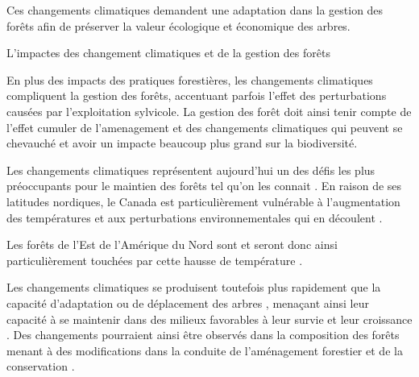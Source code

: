 Ces changements climatiques demandent une adaptation dans la gestion des forêts afin de préserver la valeur écologique et économique des arbres. 




L'impactes des changement climatiques et de la gestion des forêts 

En plus des impacts des pratiques forestières, les changements climatiques compliquent la gestion des forêts, accentuant parfois l'effet des perturbations causées par l'exploitation sylvicole. 
La gestion des forêt doit ainsi tenir compte de l'effet cumuler de l'amenagement et des changements climatiques qui peuvent se chevauché et avoir un impacte beaucoup plus grand sur la biodiversité.





Les changements climatiques représentent aujourd'hui un des défis les plus préoccupants pour le maintien des forêts tel qu'on les connait \citep{McKenney2009Climatechange,Trumbore2015Foresthealth,Seidl2017Forestdisturbances,Messier2022Warningnatural}.  
En raison de ses latitudes nordiques, le Canada est particulièrement vulnérable à l'augmentation des températures et aux perturbations environnementales qui en découlent \citep{Alo2008Potentialfuture,Bush2019Canadachanging}. 

Les forêts de l'Est de l'Amérique du Nord sont et seront donc ainsi particulièrement touchées par cette hausse de température \citep{Park2014Canboreal,Mahony2017closerlook,Sittaro2017Treerange,Messier2022Warningnatural}.


Les changements climatiques se produisent toutefois plus rapidement que la capacité d'adaptation ou de déplacement des arbres \citep{Aitken2008Adaptationmigration,Loarie2009velocityclimate,Vitt2010Assistedmigration,Harrison2020Plantcommunity}, 
menaçant ainsi leur capacité à se maintenir dans des milieux favorables à leur survie et leur croissance \citep{Zhu2012Failuremigrate,Sittaro2017Treerange,Woodall2018Decadalchanges}.
Des changements pourraient ainsi être observés dans la composition des forêts menant à des modifications dans la conduite de l'aménagement forestier et de la conservation \citep{McKenney2009Climatechange,Chmura2011Forestresponses,Lo2011Linkingclimate}.




